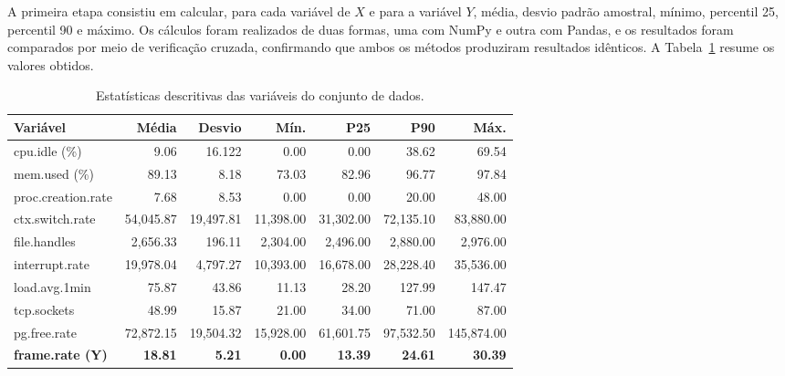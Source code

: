 \documentclass[11pt,a4paper]{article}
\begin{document}
A primeira etapa consistiu em calcular, para cada variável de \(X\) e para a variável \(Y\), média, desvio padrão amostral, mínimo, percentil 25, percentil 90 e máximo. Os cálculos foram realizados de duas formas, uma com NumPy e outra com Pandas, e os resultados foram comparados por meio de verificação cruzada, confirmando que ambos os métodos produziram resultados idênticos. A Tabela~\ref{tab:stats} resume os valores obtidos.

\begin{table}[H]
\centering
\caption{Estatísticas descritivas das variáveis do conjunto de dados.}
\label{tab:stats}
\small
\begin{tabular}{lrrrrrr}
\toprule
\textbf{Variável} & \textbf{Média} & \textbf{Desvio} & \textbf{Mín.} & \textbf{P25} & \textbf{P90} & \textbf{Máx.} \\
\midrule
cpu.idle (\%)              & 9.06     & 16.122   & 0.00    & 0.00     & 38.62    & 69.54 \\
mem.used (\%)              & 89.13    & 8.18     & 73.03   & 82.96   & 96.77    & 97.84 \\
proc.creation.rate         & 7.68     & 8.53     & 0.00     & 0.00     & 20.00    & 48.00 \\
ctx.switch.rate            & 54,045.87 & 19,497.81 & 11,398.00 & 31,302.00 & 72,135.10 & 83,880.00 \\
file.handles               & 2,656.33  & 196.11   & 2,304.00  & 2,496.00  & 2,880.00  & 2,976.00 \\
interrupt.rate             & 19,978.04 & 4,797.27  & 10,393.00 & 16,678.00 & 28,228.40 & 35,536.00 \\
load.avg.1min              & 75.87    & 43.86    & 11.13    & 28.20    & 127.99   & 147.47 \\
tcp.sockets                & 48.99    & 15.87    & 21.00    & 34.00    & 71.00    & 87.00 \\
pg.free.rate                & 72,872.15 & 19,504.32 & 15,928.00 & 61,601.75 & 97,532.50 & 145,874.00 \\
\textbf{frame.rate (Y)}    & \textbf{18.81} & \textbf{5.21} & \textbf{0.00} & \textbf{13.39} & \textbf{24.61} & \textbf{30.39} \\
\bottomrule
\end{tabular}
\end{table}
\end{document}
